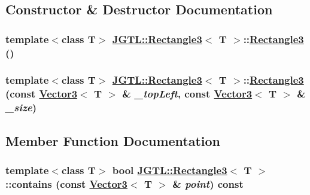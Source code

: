 \subsection{Constructor \& Destructor Documentation}
\hypertarget{class_j_g_t_l_1_1_rectangle3_95d1120ba01aa98bfd5a459b0c9a6a12}{
\subsubsection[Rectangle3]{\setlength{\rightskip}{0pt plus 5cm}template$<$class T$>$ \hyperlink{class_j_g_t_l_1_1_rectangle3}{JGTL::Rectangle3}$<$ T $>$::\hyperlink{class_j_g_t_l_1_1_rectangle3}{Rectangle3} ()}}
\label{class_j_g_t_l_1_1_rectangle3_95d1120ba01aa98bfd5a459b0c9a6a12}


\hypertarget{class_j_g_t_l_1_1_rectangle3_7907c71bb953badbd9f68501e0bb9b8a}{
\subsubsection[Rectangle3]{\setlength{\rightskip}{0pt plus 5cm}template$<$class T$>$ \hyperlink{class_j_g_t_l_1_1_rectangle3}{JGTL::Rectangle3}$<$ T $>$::\hyperlink{class_j_g_t_l_1_1_rectangle3}{Rectangle3} (const \hyperlink{class_j_g_t_l_1_1_vector3}{Vector3}$<$ T $>$ \& {\em \_\-top\-Left}, const \hyperlink{class_j_g_t_l_1_1_vector3}{Vector3}$<$ T $>$ \& {\em \_\-size})}}
\label{class_j_g_t_l_1_1_rectangle3_7907c71bb953badbd9f68501e0bb9b8a}




\subsection{Member Function Documentation}
\hypertarget{class_j_g_t_l_1_1_rectangle3_51f62ab3daf886c38057a72ecd0010d8}{
\subsubsection[contains]{\setlength{\rightskip}{0pt plus 5cm}template$<$class T$>$ bool \hyperlink{class_j_g_t_l_1_1_rectangle3}{JGTL::Rectangle3}$<$ T $>$::contains (const \hyperlink{class_j_g_t_l_1_1_vector3}{Vector3}$<$ T $>$ \& {\em point}) const}}
\label{class_j_g_t_l_1_1_rectangle3_51f62ab3daf886c38057a72ecd0010d8}


